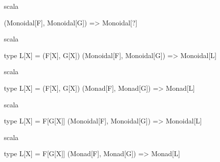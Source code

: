 \documentclass{beamer}
\begin{document}
\begin{frame}[fragile]

  \centering
  \large

  \begin{cminted}{scala}

(Monoidal[F], Monoidal[G]) => Monoidal[?]

  \end{cminted}

\end{frame}

\begin{frame}[fragile]

  \centering
  \large

  \begin{cminted}{scala}

type L[X] = (F[X], G[X])
(Monoidal[F], Monoidal[G]) => Monoidal[L]

  \end{cminted}

\end{frame}

\begin{frame}[fragile]

  \centering
  \large

  \begin{cminted}{scala}

type L[X] = (F[X], G[X])
(Monad[F], Monad[G]) => Monad[L]

  \end{cminted}

\end{frame}

\begin{frame}[fragile]

  \centering
  \large

  \begin{cminted}{scala}

type L[X] = F[G[X]]
(Monoidal[F], Monoidal[G]) => Monoidal[L]

  \end{cminted}

\end{frame}

\begin{frame}[fragile]

  \centering
  \large

  \begin{cminted}{scala}

type L[X] = F[G[X]]
(Monad[F], Monad[G]) => Monad[L]

  \end{cminted}

\end{frame}
\end{document}

